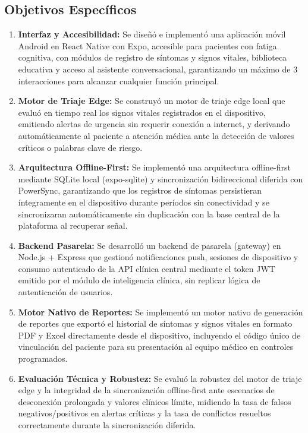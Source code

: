 \subsection*{Objetivos Específicos}
\begin{enumerate}
    \item \textbf{Interfaz y Accesibilidad:} Se diseñó e implementó una aplicación móvil Android en React Native con Expo, accesible para pacientes con fatiga cognitiva, con módulos de registro de síntomas y signos vitales, biblioteca educativa y acceso al asistente conversacional, garantizando un máximo de 3 interacciones para alcanzar cualquier función principal.
    \item \textbf{Motor de Triaje Edge:} Se construyó un motor de triaje edge local que evaluó en tiempo real los signos vitales registrados en el dispositivo, emitiendo alertas de urgencia sin requerir conexión a internet, y derivando automáticamente al paciente a atención médica ante la detección de valores críticos o palabras clave de riesgo.
    \item \textbf{Arquitectura Offline-First:} Se implementó una arquitectura offline-first mediante SQLite local (expo-sqlite) y sincronización bidireccional diferida con PowerSync, garantizando que los registros de síntomas persistieran íntegramente en el dispositivo durante períodos sin conectividad y se sincronizaran automáticamente sin duplicación con la base central de la plataforma al recuperar señal.
    \item \textbf{Backend Pasarela:} Se desarrolló un backend de pasarela (gateway) en Node.js + Express que gestionó notificaciones push, sesiones de dispositivo y consumo autenticado de la API clínica central mediante el token JWT emitido por el módulo de inteligencia clínica, sin replicar lógica de autenticación de usuarios.
    \item \textbf{Motor Nativo de Reportes:} Se implementó un motor nativo de generación de reportes que exportó el historial de síntomas y signos vitales en formato PDF y Excel directamente desde el dispositivo, incluyendo el código único de vinculación del paciente para su presentación al equipo médico en controles programados.
    \item \textbf{Evaluación Técnica y Robustez:} Se evaluó la robustez del motor de triaje edge y la integridad de la sincronización offline-first ante escenarios de desconexión prolongada y valores clínicos límite, midiendo la tasa de falsos negativos/positivos en alertas críticas y la tasa de conflictos resueltos correctamente durante la sincronización diferida.
\end{enumerate}

